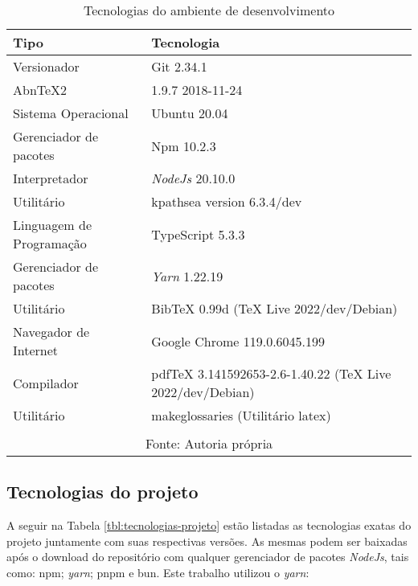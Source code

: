 \begin{table}[H]
    \centering
    \caption{Tecnologias do ambiente de desenvolvimento}
    \label{tbl:tecnologias-ambiente}
    \renewcommand{\arraystretch}{1.5}
    \begin{tabular}{p{6.4000cm} p{9.6000cm}}
        \hline
        \textbf{Tipo} & \textbf{Tecnologia} \\
        \hline
        Versionador & Git 2.34.1 \\
		AbnTeX2 & 1.9.7 2018-11-24 \\
		Sistema Operacional & Ubuntu 20.04 \\
		Gerenciador de pacotes & Npm 10.2.3 \\
		Interpretador & \textit{NodeJs} 20.10.0 \\
		Utilitário & kpathsea version 6.3.4/dev \\
		Linguagem de Programação & TypeScript 5.3.3 \\
		Gerenciador de pacotes & \textit{Yarn} 1.22.19 \\
		Utilitário & BibTeX 0.99d (TeX Live 2022/dev/Debian) \\
		Navegador de Internet & Google Chrome 119.0.6045.199 \\
		Compilador & pdfTeX 3.141592653-2.6-1.40.22 (TeX Live 2022/dev/Debian) \\
		Utilitário & makeglossaries (Utilitário \acrshort{latex}) \\
        \hline
        \\\multicolumn{2}{c}{\fontsize{10pt}{12pt}Fonte: Autoria própria}
    \end{tabular}
\end{table}

\subsection{Tecnologias do projeto}

A seguir
na
Tabela \ref{tbl:tecnologias-projeto}
estão listadas as tecnologias exatas do projeto juntamente com
suas respectivas versões. As mesmas podem ser baixadas após o download do
repositório com qualquer gerenciador de pacotes \textit{NodeJs}, tais como: npm;
\textit{yarn}; pnpm e bun. Este trabalho utilizou o \textit{yarn}:

